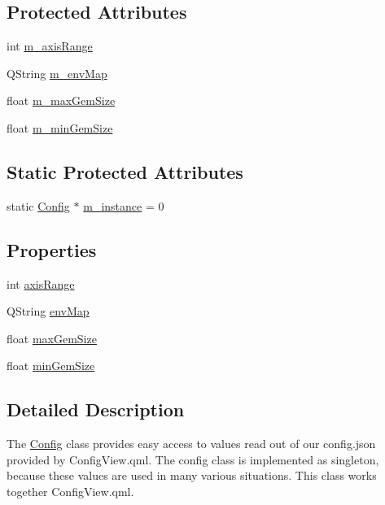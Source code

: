 \subsection*{Protected Attributes}
\begin{DoxyCompactItemize}
\item 
int \hyperlink{class_config_a5f172b706977841fdcb91351eeae817e}{m\+\_\+axis\+Range}
\item 
Q\+String \hyperlink{class_config_a70804accd579749b776f9c0c3e5c000b}{m\+\_\+env\+Map}
\item 
float \hyperlink{class_config_ae8a0c3906a4d18952a7fbb00868c963e}{m\+\_\+max\+Gem\+Size}
\item 
float \hyperlink{class_config_a7284f245054875419777e7cbad67183c}{m\+\_\+min\+Gem\+Size}
\end{DoxyCompactItemize}
\subsection*{Static Protected Attributes}
\begin{DoxyCompactItemize}
\item 
static \hyperlink{class_config}{Config} $\ast$ \hyperlink{class_config_af8e6282b4a10e5bce08419395394581b}{m\+\_\+instance} = 0
\end{DoxyCompactItemize}
\subsection*{Properties}
\begin{DoxyCompactItemize}
\item 
int \hyperlink{class_config_a5068b92866fd941b72314c6c7f36145f}{axis\+Range}
\item 
Q\+String \hyperlink{class_config_ae85b2124ed4685d081068c6028081d28}{env\+Map}
\item 
float \hyperlink{class_config_a9e631288322234538f08c601202c0dba}{max\+Gem\+Size}
\item 
float \hyperlink{class_config_a26688d51537cbea3ee27810b3f6d1568}{min\+Gem\+Size}
\end{DoxyCompactItemize}


\subsection{Detailed Description}
The \hyperlink{class_config}{Config} class provides easy access to values read out of our config.\+json provided by Config\+View.\+qml.  The config class is implemented as singleton, because these values are used in many various situations. This class works together Config\+View.\+qml. 

